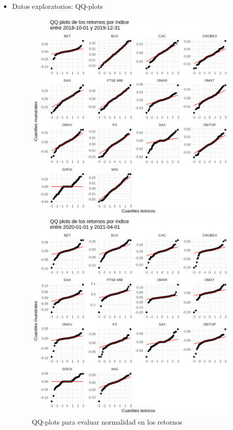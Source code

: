 \documentclass[12pt]{article}
\begin{document}
\begin{itemize}
\item Datos exploratorios: QQ-plots
\begin{figure}[H]
    \centering
    \begin{minipage}{0.48\textwidth}
        \centering
        \includegraphics[width=\linewidth]{QQplot.png}
    \end{minipage}
    \hfill
    \begin{minipage}{0.48\textwidth}
        \centering
        \includegraphics[width=\linewidth]{QQplot2.png}
    \end{minipage}
    \caption{QQ-plots para evaluar normalidad en los retornos}
\end{figure}
\end{itemize}
\end{document}
